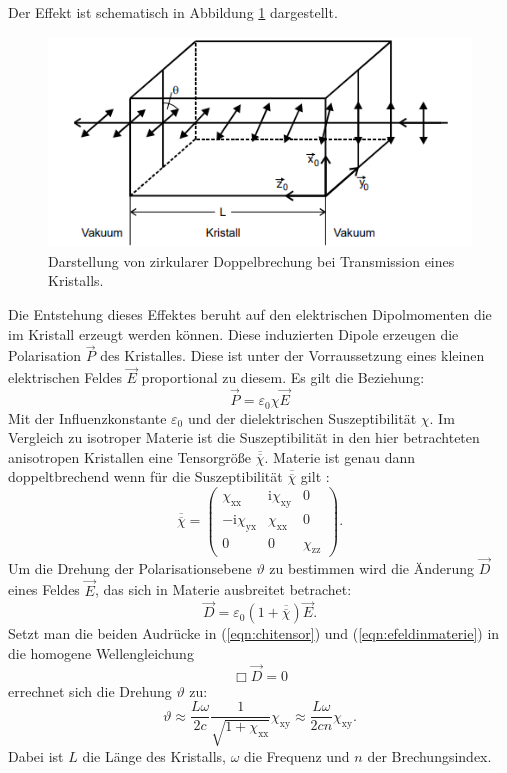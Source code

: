 Der Effekt ist schematisch in Abbildung \ref{fig:brechung} dargestellt.
\begin{figure}[h]
  \centering
  \includegraphics[scale=0.7]{fig/brechung.png}
  \caption{Darstellung von zirkularer Doppelbrechung bei Transmission eines Kristalls. \cite[1]{Anleitung}}
  \label{fig:brechung}
\end{figure}
Die Entstehung dieses Effektes beruht auf den elektrischen Dipolmomenten die im Kristall erzeugt werden können. Diese induzierten Dipole erzeugen die Polarisation $\vec{P}$ des Kristalles. Diese ist unter der Vorraussetzung eines kleinen elektrischen Feldes $\vec{E}$ proportional zu diesem. Es gilt die Beziehung:
\begin{equation}
  \vec{P}=\varepsilon_\mathrm{0} \chi \vec{E}
\end{equation}
Mit der Influenzkonstante $\varepsilon_\mathrm{0}$ und der dielektrischen Suszeptibilität $\chi$. Im Vergleich zu isotroper Materie ist die Suszeptibilität in den hier betrachteten anisotropen Kristallen eine Tensorgröße $\overline{\overline{\chi}}$. Materie ist genau dann doppeltbrechend wenn für die Suszeptibilität $\overline{\overline{\chi}}$ gilt \cite[3-5]{Anleitung}:
\begin{equation}
  \label{eqn:chitensor}
  \overline{\overline{\chi}}=\begin{pmatrix} \chi_\mathrm{xx} & \mathrm{i}\chi_\mathrm{xy} & 0 \\ -\mathrm{i}\chi_\mathrm{yx} & \chi_\mathrm{xx} & 0 \\ 0 & 0 & \chi_\mathrm{zz} \end{pmatrix}.
\end{equation}
Um die Drehung der Polarisationsebene $\vartheta$ zu bestimmen wird die Änderung $\vec{D}$ eines Feldes $\vec{E}$, das sich in Materie ausbreitet betrachet:
\begin{equation}
  \label{eqn:efeldinmaterie}
  \vec{D}=\varepsilon_0\left(1+\overline{\overline{\chi}}\right)\vec{E}.
\end{equation}
Setzt man die beiden Audrücke in (\ref{eqn:chitensor}) und (\ref{eqn:efeldinmaterie}) in die homogene Wellengleichung
\begin{equation*}
  \Box \vec{D} = 0
\end{equation*}
errechnet sich die Drehung $\vartheta$ \cite[3-5]{Anleitung} zu:
\begin{equation}
  \label{eq:drehungmitchi}
  \vartheta \approx \frac{L\omega}{2c} \frac{1}{\sqrt{1+\chi_\mathrm{xx}}} \chi_\mathrm{xy}\approx \frac{L\omega}{2cn} \chi_\mathrm{xy}.
\end{equation}
Dabei ist $L$ die Länge des Kristalls, $\omega$ die Frequenz und $n$ der Brechungsindex.

